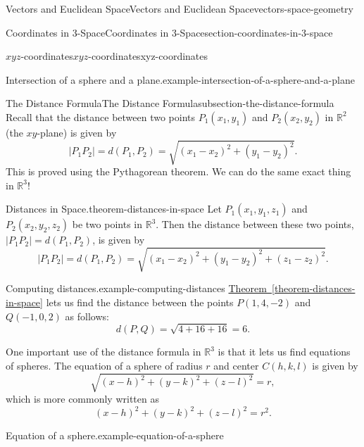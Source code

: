 \documentclass[oneside,10pt,]{book}
\numberwithin{equation}{section}
\newcommand{\RR}{\mathbb{R}}
\begin{document}
\begin{chapterptx}{Vectors and Euclidean Space}{}{Vectors and Euclidean Space}{}{}{vectors-space-geometry}
\begin{sectionptx}{Coordinates in 3-Space}{}{Coordinates in 3-Space}{}{}{section-coordinates-in-3-space}
\begin{subsectionptx}{\(xyz\)-coordinates}{}{\(xyz\)-coordinates}{}{}{xyz-coordinates}
\begin{example}{Intersection of a sphere and a plane.}{example-intersection-of-a-sphere-and-a-plane}
\end{example}
\end{subsectionptx}
%
%
\typeout{************************************************}
\typeout{************************************************}
%
\begin{subsectionptx}{The Distance Formula}{}{The Distance Formula}{}{}{subsection-the-distance-formula}
\hypertarget{p-1073}{}%
Recall that the distance between two points \(P_{1}(x_{1},y_{1})\) and \(P_{2}(x_{2},y_{2})\) in \(\RR^{2}\) (the \(xy\)-plane) is given by%
%
\begin{equation*}
|P_{1}P_{2}| = d(P_{1},P_{2}) = \sqrt{(x_{1}-x_{2})^{2}+(y_{1}-y_{2})^{2}}.
\end{equation*}
\hypertarget{p-1074}{}%
This is proved using the Pythagorean theorem. We can do the same exact thing in \(\RR^{3}\)!%
\begin{theorem}{Distances in Space.}{}{theorem-distances-in-space}%
\hypertarget{p-1075}{}%
Let \(P_{1}(x_{1},y_{1},z_{1})\) and \(P_{2}(x_{2},y_{2},z_{2})\) be two points in \(\RR^{3}\). Then the distance between these two points, \(|P_{1}P_{2}| = d(P_{1},P_{2})\), is given by%
\begin{equation*}
|P_{1}P_{2}| = d(P_{1},P_{2}) = \sqrt{(x_{1}-x_{2})^{2}+(y_{1}-y_{2})^{2} + (z_{1}-z_{2})^{2}}.
\end{equation*}
%
\end{theorem}
\begin{example}{Computing distances.}{example-computing-distances}%
\hypertarget{p-1076}{}%
\hyperref[theorem-distances-in-space]{Theorem~\ref{theorem-distances-in-space}} lets us find the distance between the points \(P(1,4,-2)\) and \(Q(-1,0,2)\) as follows:%
%
\begin{equation*}
d(P,Q) = \sqrt{4+16+16} = 6.
\end{equation*}
\end{example}
\hypertarget{p-1077}{}%
One important use of the distance formula in \(\RR^{3}\) is that it lets us find equations of spheres. The equation of a sphere of radius \(r\) and center \(C(h,k,l)\) is given by%
\begin{equation*}
\sqrt{(x-h)^{2}+(y-k)^{2}+(z-l)^{2}} = r,
\end{equation*}
which is more commonly written as%
\begin{equation*}
(x-h)^{2}+(y-k)^{2}+(z-l)^{2} = r^{2}.
\end{equation*}
%
\begin{example}{Equation of a sphere.}{example-equation-of-a-sphere}%

\end{example}
\end{subsectionptx}
\end{sectionptx}
\end{chapterptx}
\end{document}
